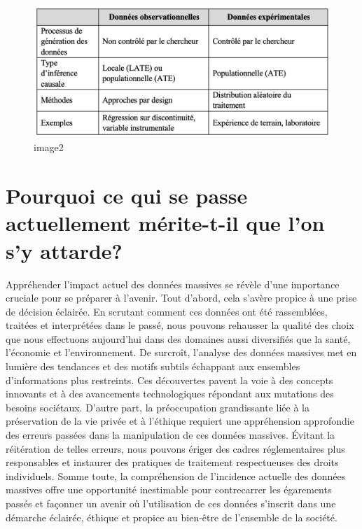 \documentclass[
  letterpaper,
]{scrbook}
\begin{document}
\begin{figure}

{\centering \includegraphics{images/chapitre1_2.png}

}

\caption{image2}

\end{figure}

\hypertarget{pourquoi-ce-qui-se-passe-actuellement-muxe9rite-t-il-que-lon-sy-attarde}{%
\section{Pourquoi ce qui se passe actuellement mérite-t-il que l'on s'y
attarde?}\label{pourquoi-ce-qui-se-passe-actuellement-muxe9rite-t-il-que-lon-sy-attarde}}

Appréhender l'impact actuel des données massives se révèle d'une
importance cruciale pour se préparer à l'avenir. Tout d'abord, cela
s'avère propice à une prise de décision éclairée. En scrutant comment
ces données ont été rassemblées, traitées et interprétées dans le passé,
nous pouvons rehausser la qualité des choix que nous effectuons
aujourd'hui dans des domaines aussi diversifiés que la santé, l'économie
et l'environnement. De surcroît, l'analyse des données massives met en
lumière des tendances et des motifs subtils échappant aux ensembles
d'informations plus restreints. Ces découvertes pavent la voie à des
concepts innovants et à des avancements technologiques répondant aux
mutations des besoins sociétaux. D'autre part, la préoccupation
grandissante liée à la préservation de la vie privée et à l'éthique
requiert une appréhension approfondie des erreurs passées dans la
manipulation de ces données massives. Évitant la réitération de telles
erreurs, nous pouvons ériger des cadres réglementaires plus responsables
et instaurer des pratiques de traitement respectueuses des droits
individuels. Somme toute, la compréhension de l'incidence actuelle des
données massives offre une opportunité inestimable pour contrecarrer les
égarements passés et façonner un avenir où l'utilisation de ces données
s'inscrit dans une démarche éclairée, éthique et propice au bien-être de
l'ensemble de la société.
\end{document}
